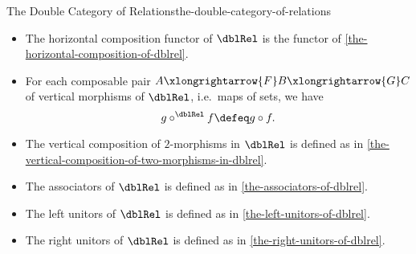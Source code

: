 \begin{definition}{The Double Category of Relations}{the-double-category-of-relations}
\begin{itemize}
\begin{webcompile}
            \end{webcompile}%
        \item{}The horizontal composition functor of $\dblRel$ is the functor of \cref{the-horizontal-composition-of-dblrel}.
        \item{}For each composable pair $A\smash{\xlongrightarrow{F}}B\smash{\xlongrightarrow{G}}C$ of vertical morphisms of $\dblRel$, i.e.\ maps of sets, we have
            \[
                g\mathbin{{\circ}^{\dblRel}}f
                \defeq
                g\circ f.
            \]%
        \item{}The vertical composition of $2$-morphisms in $\dblRel$ is defined as in \cref{the-vertical-composition-of-two-morphisms-in-dblrel}.
        \item{}The associators of $\dblRel$ is defined as in \cref{the-associators-of-dblrel}.
        \item{}The left unitors of $\dblRel$ is defined as in \cref{the-left-unitors-of-dblrel}.
        \item{}The right unitors of $\dblRel$ is defined as in \cref{the-right-unitors-of-dblrel}.
    \end{itemize}
\end{definition}
